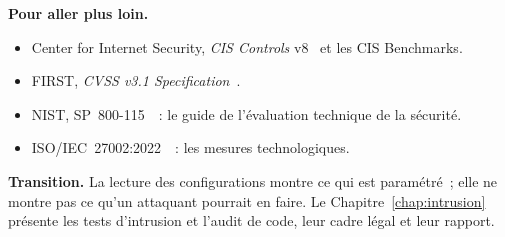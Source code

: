 \begin{boxinfo}
\textbf{Pour aller plus loin.}
\begin{itemize}
    \item Center for Internet Security, \textit{CIS Controls}
          v8~\cite{cis2021controls} et les CIS Benchmarks.
    \item FIRST, \textit{CVSS v3.1 Specification}~\cite{first2019cvss}.
    \item NIST, SP~800-115~\cite{nist2008sp800115}~: le guide de
          l'évaluation technique de la sécurité.
    \item ISO/IEC~27002:2022~\cite{iso27002_2022}~: les mesures
          technologiques.
\end{itemize}
\end{boxinfo}

\begin{boxinfo}
\textbf{Transition.} La lecture des configurations montre ce qui est
paramétré~; elle ne montre pas ce qu'un attaquant pourrait en faire. Le
Chapitre~\ref{chap:intrusion} présente les tests d'intrusion et l'audit
de code, leur cadre légal et leur rapport.
\end{boxinfo}
